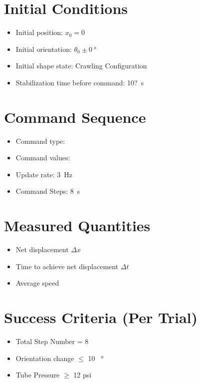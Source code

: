 \documentclass[11pt]{article}
\begin{document}
\section*{Initial Conditions}
\begin{itemize}[noitemsep]
    \item Initial position: $x_0 = 0$
    \item Initial orientation: $\theta_0 \pm 0~\si{\degree}$
    \item Initial shape state: Crawling Configuration
    \item Stabilization time before command: 10?~s
\end{itemize}

\section*{Command Sequence}
\begin{itemize}[noitemsep]
    \item Command type: \underline{\hspace{5cm}}
    \item Command values: \underline{\hspace{5cm}}
    \item Update rate: 3~Hz
    \item Command Steps: 8~s
\end{itemize}

\section*{Measured Quantities}
\begin{itemize}[noitemsep]
    \item Net displacement $\Delta x$
    \item Time to achieve net displacement $\Delta t$
    \item Average speed
\end{itemize}

\section*{Success Criteria (Per Trial)}
\begin{itemize}[noitemsep]
    \item Total Step Number = 8
    \item Orientation change $\leq$ 10 ~\si{\degree} 
    \item Tube Pressure $\geq$ 12 psi
\end{itemize}
\end{document}
